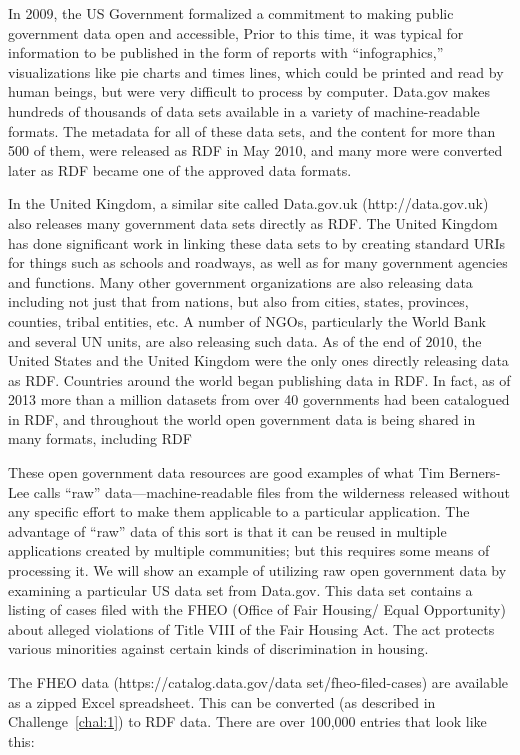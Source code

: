 In 2009, the US Government formalized a commitment to making public
government data open and accessible, Prior to this time, it was typical
for information to be published in the form of reports with
``infographics,'' visualizations like pie charts and times lines, which
could be printed and read by human beings, but were very difficult to
process by computer. Data.gov makes hundreds of thousands of data sets
available in a variety of machine-readable formats. The metadata for all
of these data sets, and the content for more than 500 of them, were
released as RDF in May 2010, and many more were converted later as RDF became one of the approved data formats. 

In the United Kingdom, a similar site called Data.gov.uk
(http://data.gov.uk) also releases many government data sets directly as
RDF. The United Kingdom has done significant work in linking these data
sets to by creating standard URIs for things such as schools and
roadways, as well as for many government agencies and functions. Many
other government organizations are also releasing data including not
just that from nations, but also from cities, states, provinces,
counties, tribal entities, etc. A number of NGOs, particularly the World
Bank and several UN units, are also releasing such data. As of the end
of 2010, the United States and the United Kingdom were the only ones
directly releasing data as RDF.  Countries around the 
world began publishing data in RDF.  In fact, as of 2013 more than a million datasets from over 40 governments 
had been catalogued in RDF, and throughout the world open government data is being shared in many formats, including RDF

These open government data resources are good examples of what Tim
Berners-Lee calls ``raw'' data---machine-readable files from the
wilderness released without any specific effort to make them applicable
to a particular application. The advantage of ``raw'' data of this sort
is that it can be reused in multiple applications created by multiple
communities; but this requires some means of processing it. We will show
an example of utilizing raw open government data by examining a
particular US data set from Data.gov. This data set contains a listing
of cases filed with the FHEO (Office of Fair Housing/ Equal Opportunity)
about alleged violations of Title VIII of the Fair Housing Act. The act
protects various minorities against certain kinds of discrimination in
housing.

The FHEO data (https://catalog.data.gov/data set/fheo-filed-cases) are available 
as a zipped Excel spreadsheet. This can be converted (as described in Challenge~\ref{chal:1}) to RDF data. 
There are over
100,000 entries that look like this:

